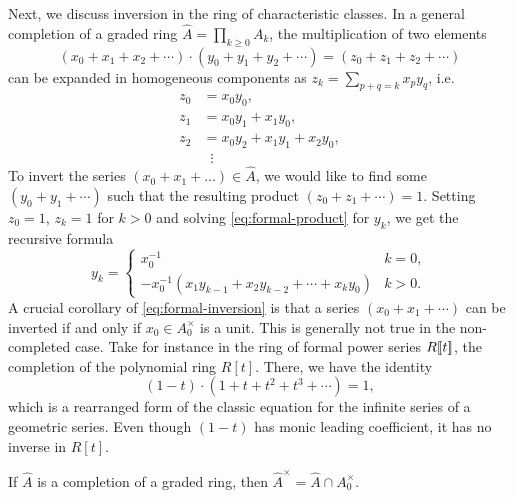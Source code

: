 Next, we discuss inversion in the ring of characteristic classes.
In a general completion of a graded ring $\widehat{A}=\prod_{k\geq 0}A_k$, the multiplication of two elements
\[
	(x_0+x_1+x_2+\cdots)\cdot (y_0+y_1+y_2+\cdots) = (z_0 + z_1 + z_2+\cdots)
\]
can be expanded in homogeneous components as $z_k=\sum_{p+q=k} x_py_q$, i.e.
\begin{equation}\label{eq:formal-product}
	\begin{aligned}
		z_0 & = x_0y_0,                 \\
		z_1 & = x_0y_1 + x_1y_0,        \\
		z_2 & = x_0y_2 + x_1y_1+x_2y_0, \\
		    & \;\;\vdots
	\end{aligned}
\end{equation}
To invert the series $(x_0+ x_1+\ldots)\in \widehat{A}$, we would like to find some $(y_0+y_1+\cdots)$ such that the resulting product $(z_0+z_1+\cdots)=1$. Setting $z_0=1$, $z_k=1$ for $k>0$ and solving \cref{eq:formal-product} for $y_k$, we get the recursive formula
\begin{equation}\label{eq:formal-inversion}
	y_k = \begin{cases}x_0^{-1}                                        & k=0,   \\
             -x_0^{-1}(x_1y_{k-1}+x_2y_{k-2}+\cdots +x_ky_0) & k > 0.
	\end{cases}
\end{equation}
A crucial corollary of \cref{eq:formal-inversion} is that a series $(x_0+x_1+\cdots)$ can be inverted if and only if $x_0\in A_0^\times$ is a unit. This is generally not true in the non-completed case. Take for instance in the ring of formal power series $R[\![t]\!]$, the completion of the polynomial ring $R[t]$. There, we have the identity
\[
	(1-t)\cdot (1+t+t^2+t^3+\cdots) = 1,
\]
which is a rearranged form of the classic equation for the infinite series of a geometric series. Even though $(1-t)$ has monic leading coefficient, it has no inverse in $R[t]$.

\begin{proposition}\label{prop:formal-inverse}
	If $\widehat{A}$ is a completion of a graded ring, then $\widehat{A}^\times = \widehat{A} \cap A_0^\times$.
\end{proposition}

